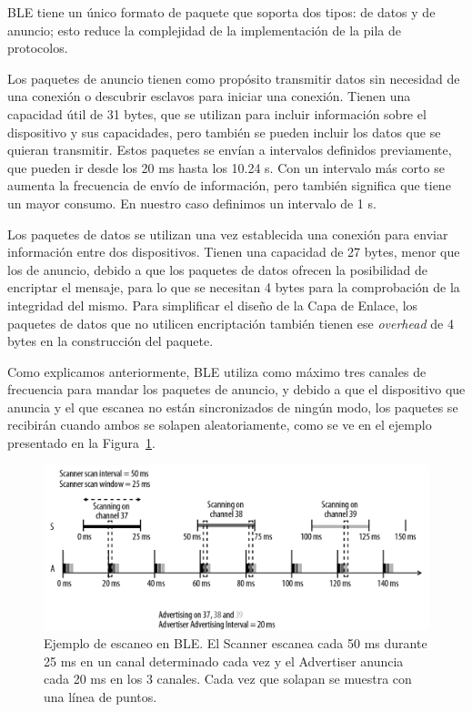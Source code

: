 BLE tiene un único formato de paquete que soporta dos tipos: de datos y de anuncio; esto reduce la complejidad de la implementación de la pila de protocolos.

Los paquetes de anuncio tienen como propósito transmitir datos sin necesidad de una conexión o descubrir esclavos para iniciar una conexión. Tienen una capacidad útil de 31 bytes, que se utilizan para incluir información sobre el dispositivo y sus capacidades, pero también se pueden incluir los datos que se quieran transmitir. Estos paquetes se envían a intervalos definidos previamente, que pueden ir desde los 20 ms hasta los 10.24 s. Con un intervalo más corto se aumenta la frecuencia de envío de información, pero también significa que tiene un mayor consumo. En nuestro caso definimos un intervalo de 1 s.

Los paquetes de datos se utilizan una vez establecida una conexión para enviar información entre dos dispositivos. Tienen una capacidad de 27 bytes, menor que los de anuncio, debido a que los paquetes de datos ofrecen la posibilidad de encriptar el mensaje, para lo que se necesitan 4 bytes para la comprobación de la integridad del mismo. Para simplificar el diseño de la Capa de Enlace, los paquetes de datos que no utilicen encriptación también tienen ese \emph{overhead} de 4 bytes en la construcción del paquete.

Como explicamos anteriormente, BLE utiliza como máximo tres canales de frecuencia para mandar los paquetes de anuncio, y debido a que el dispositivo que anuncia y el que escanea no están sincronizados de ningún modo, los paquetes se recibirán cuando ambos se solapen aleatoriamente, como se ve en el ejemplo presentado en la Figura~\ref{figuraBLEScan}.

\begin{figure}[h]%
	\centering
    \includegraphics[width=\linewidth]{figures/ble_scan_example.png} %
    \caption[Ejemplo de escaneo BLE]{Ejemplo de escaneo en BLE. El Scanner escanea cada 50 ms durante 25 ms en un canal determinado cada vez y el Advertiser anuncia cada 20 ms en los 3 canales. Cada vez que solapan se muestra con una línea de puntos.}
   	\label{figuraBLEScan}
\end{figure}

